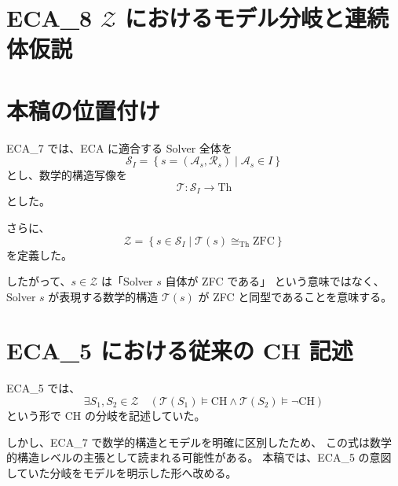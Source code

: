 \documentclass[a4paper,11pt]{article}
\newcommand{\Solver}{\mathcal{S}}
\newcommand{\Th}{\mathrm{Th}}
\begin{document}
\section{ECA_8 $\mathcal{Z}$ におけるモデル分岐と連続体仮説}


\begin{abstract}
本稿では、ECA_7 において再定義した
\[
\mathcal{Z}=
\left\{s\in\Solver_I\mid
\mathcal{T}(s)\cong_{\mathrm{Th}}\mathrm{ZFC}\right\}
\]
を前提として、ECA_5 で記述されていた連続体仮説（CH）の「Solver に依存する」という記述を、数学的構造レベルとモデルレベルに分離して再構成する。

特に、異なる Solver が ZFC と同型な数学的構造を表現することと、それらの数学的構造について CH または $\neg\mathrm{CH}$ を満たすモデルを考えることを区別する。

本稿の目的は CH の独立性そのものを新たに証明することではない。
また、$\mathcal{Z}$ の濃度や連続体濃度 $2^{\aleph_0}$ を
本稿のモデル分岐から導出するものでもない。
\end{abstract}

\section{本稿の位置付け}

ECA_7 では、ECA に適合する Solver 全体を
\[
\Solver_I=
\left\{s=(\mathcal{A}_s,\mathcal{R}_s)\mid
\mathcal{A}_s\in I\right\}
\]
とし、数学的構造写像を
\[
\mathcal{T}:\Solver_I\longrightarrow\Th
\]
とした。

さらに、
\[
\mathcal{Z}=
\left\{s\in\Solver_I\mid
\mathcal{T}(s)\cong_{\mathrm{Th}}\mathrm{ZFC}\right\}
\]
を定義した。

したがって、$s\in\mathcal{Z}$ は「Solver $s$ 自体が ZFC である」
という意味ではなく、Solver $s$ が表現する数学的構造
$\mathcal{T}(s)$ が ZFC と同型であることを意味する。

\section{ECA_5 における従来の CH 記述}

ECA_5 では、
\[
\exists S_1,S_2\in\mathcal{Z}\quad
\left(
\mathcal{T}(S_1)\models\mathrm{CH}
\land
\mathcal{T}(S_2)\models\neg\mathrm{CH}
\right)
\]
という形で CH の分岐を記述していた。

しかし、ECA_7 で数学的構造とモデルを明確に区別したため、
この式は数学的構造レベルの主張として読まれる可能性がある。
本稿では、ECA_5 の意図していた分岐をモデルを明示した形へ改める。
\end{document}
